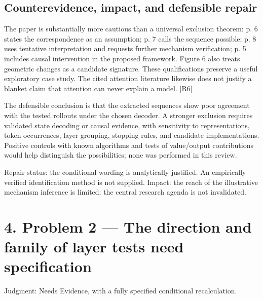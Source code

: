 \documentclass[10pt]{article}
\begin{document}
\subsection*{Counterevidence, impact, and defensible repair}
The paper is substantially more cautious than a universal exclusion theorem: p. 6 states the correspondence as an assumption; p. 7 calls the sequence possible; p. 8 uses tentative interpretation and requests further mechanism verification; p. 5 includes causal intervention in the proposed framework. Figure 6 also treats geometric changes as a candidate signature. These qualifications preserve a useful exploratory case study. The cited attention literature likewise does not justify a blanket claim that attention can never explain a model. [R6]\par
The defensible conclusion is that the extracted sequences show poor agreement with the tested rollouts under the chosen decoder. A stronger exclusion requires validated state decoding or causal evidence, with sensitivity to representations, token occurrences, layer grouping, stopping rules, and candidate implementations. Positive controls with known algorithms and tests of value/output contributions would help distinguish the possibilities; none was performed in this review.\par
Repair status: the conditional wording is analytically justified. An empirically verified identification method is not supplied. Impact: the reach of the illustrative mechanism inference is limited; the central research agenda is not invalidated.\par
\section*{4. Problem 2 — The direction and family of layer tests need specification}
Judgment: Needs Evidence, with a fully specified conditional recalculation.\par
\end{document}
